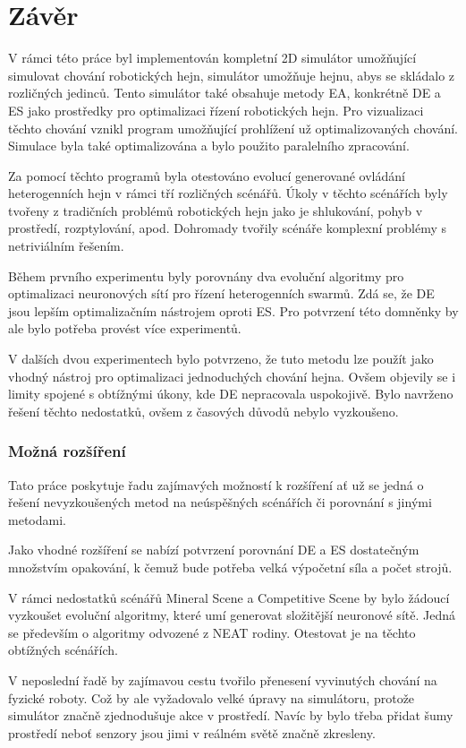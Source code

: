\chapter*{Závěr}
V rámci této práce byl implementován kompletní 2D simulátor umožňující simulovat chování robotických hejn, simulátor umožňuje hejnu, abys se skládalo z rozličných jedinců. Tento simulátor také obsahuje metody EA, konkrétně DE a ES jako prostředky pro optimalizaci řízení robotických hejn. Pro vizualizaci těchto chování vznikl program umožňující prohlížení už optimalizovaných chování. Simulace byla také optimalizována a bylo použito paralelního zpracování. 
\par
Za pomocí těchto programů byla otestováno evolucí generované ovládání heterogenních hejn v rámci tří rozličných scénářů. Úkoly v těchto scénářích byly tvořeny z tradičních problémů robotických hejn jako je shlukování, pohyb v prostředí, rozptylování, apod. Dohromady tvořily scénáře komplexní problémy s netriviálním řešením. 
\par
Během prvního experimentu byly porovnány dva evoluční algoritmy pro optimalizaci neuronových sítí pro řízení heterogenních  swarmů. Zdá se, že DE jsou lepším optimalizačním nástrojem oproti ES. Pro potvrzení této domněnky by ale bylo potřeba provést více experimentů.
\par 
V dalších dvou experimentech bylo potvrzeno, že tuto metodu lze použít jako vhodný nástroj pro optimalizaci jednoduchých chování hejna. Ovšem objevily se i limity spojené s obtížnými úkony, kde DE nepracovala uspokojivě. Bylo navrženo řešení těchto nedostatků, ovšem z časových důvodů nebylo vyzkoušeno. 

\subsection*{Možná rozšíření}
Tato práce poskytuje řadu zajímavých možností k rozšíření ať už se jedná o řešení nevyzkoušených metod na neúspěšných scénářích či porovnání s jinými metodami.
\par
Jako vhodné rozšíření se nabízí potvrzení porovnání DE a ES dostatečným množstvím opakování, k čemuž bude potřeba velká výpočetní síla a počet strojů.
\par
V rámci nedostatků scénářů Mineral Scene a Competitive Scene by bylo žádoucí vyzkoušet evoluční algoritmy, které umí generovat složitější neuronové sítě. Jedná se především o algoritmy odvozené z NEAT rodiny. Otestovat je na těchto obtížných scénářích.

\par
V neposlední řadě by zajímavou cestu tvořilo přenesení vyvinutých chování na fyzické roboty. Což by ale vyžadovalo velké úpravy na simulátoru, protože simulátor značně zjednodušuje akce v prostředí. Navíc by bylo třeba přidat šumy prostředí neboť senzory jsou jimi v reálném světě značně zkresleny. 